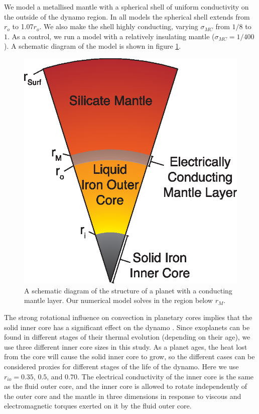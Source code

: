 We model a metallised mantle with a spherical shell of uniform conductivity on the outside of the dynamo region. In all models the spherical shell extends from $r_{o}$ to 1.07$r_{o}$. We also make the shell highly conducting, varying $\sigma_{MC}$ from $1/8$ to $1$. As a control, we run a model with a relatively insulating mantle ($\sigma_{MC}=1/400$). A schematic diagram of the model is shown in figure \ref{fig:structure}.
\begin{figure}
\centering
\noindent\includegraphics[width=.6\linewidth]{Chapter3/Figures/f1.eps}
\caption{A schematic diagram of the structure of a planet with a conducting mantle layer. Our numerical model solves in the region below $r_{M}$.}
\label{fig:structure}
\end{figure}

The strong rotational influence on convection in planetary cores implies that the solid inner core has a significant effect on the dynamo \citep{heimpel2005, stanleyfluxspot}. Since exoplanets can be found in  different stages of their thermal evolution (depending on their age), we use three different inner core sizes in this study. As a planet ages, the heat lost from the core will cause the solid inner core to grow, so the different cases can be considered proxies for different stages of the life of the dynamo. Here we use $r_{io}=0.35$, $0.5$, and $0.70$. The electrical conductivity of the inner core is the same as the fluid outer core, and the inner core is allowed to rotate independently of the outer core and the mantle in three dimensions in response to viscous and electromagnetic torques exerted on it by the fluid outer core.

